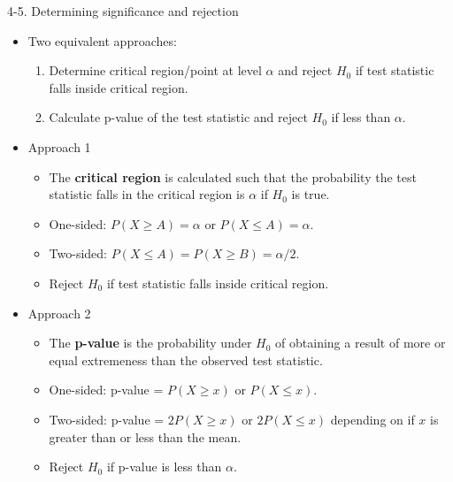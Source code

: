 \documentclass[10pt, xcolor=table]{beamer}
\begin{document}
\begin{frame}{4-5. Determining significance and rejection}

\begin{itemize}
\item Two equivalent approaches:
\begin{enumerate}
\item Determine critical region/point at level $\alpha$ and reject $H_0$ if test statistic falls inside critical region.
\item Calculate p-value of the test statistic and reject $H_0$ if less than $\alpha$.
\end{enumerate}
\item Approach 1
\begin{itemize}
\item The \textbf{critical region} is calculated such that the probability the test statistic falls in the critical region is $\alpha$ if $H_0$ is true.
\item One-sided: $P(X \geq A) = \alpha$ or $P(X \leq A) = \alpha$.
\item[] Two-sided: $P(X \leq A) = P(X \geq B) = \alpha/2$.
\item Reject $H_0$ if test statistic falls inside critical region.
\end{itemize}
\item Approach 2
\begin{itemize}
\item The \textbf{p-value} is the probability under $H_0$ of obtaining a result of more or equal extremeness than the observed test statistic.
\item One-sided: p-value = $P(X \geq x)$ or $P(X \leq x)$.
\item[] Two-sided: p-value = $2P(X \geq x)$ or $2P(X \leq x)$ depending on if $x$ is greater than or less than the mean.
\item Reject $H_0$ if p-value is less than $\alpha$.
\end{itemize}
\end{itemize}

\end{frame}
\end{document}
